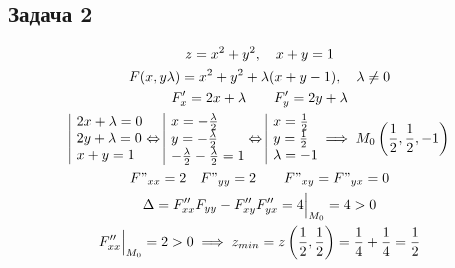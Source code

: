 \documentclass[a4paper,fleqn,12pt]{article}
\theoremstyle{definition}
\begin{document}
\subsection*{Задача 2}
\begin{gather*}
z = x^2 + y^2, \quad x+y = 1\\
F(x,y\lambda) = x^2 + y^2 + \lambda(x+y-1) , \quad \lambda \neq 0\\
F'_x = 2x + \lambda \qquad F'_y = 2y + \lambda \\
\begin{array}{|l@{}}
2x + \lambda = 0 \\
2y + \lambda = 0\\
x+y = 1
\end{array}
\Leftrightarrow
\begin{array}{|l@{}}
x = -\frac{\lambda}{2}\\
y = -\frac{\lambda}{2} \\
 -\frac{\lambda}{2}   -\frac{\lambda}{2} = 1
\end{array}
\Leftrightarrow
\begin{array}{|l@{}}
x = \frac{1}{2} \\
y = \frac{1}{2} \\
\lambda = -1
\end{array} \implies M_0 \left(\frac{1}{2}, \frac{1}{2}, -1 \right) \\
F"_{xx} = 2 \quad F"_{yy} = 2 \qquad F"_{xy} = F"_{yx} = 0 \\
\Delta = F''_{xx}F_{yy} - F''_{xy}F''_{yx} = 4 \Big|_{M_0} = 4 > 0 \\
F''_{xx} \Big|_{M_0} = 2 > 0 \implies z_{min} = z\left(\frac{1}{2}, \frac{1}{2} \right) = \frac{1}{4} + \frac{1}{4} = \frac{1}{2}
\end{gather*}
\end{document}
